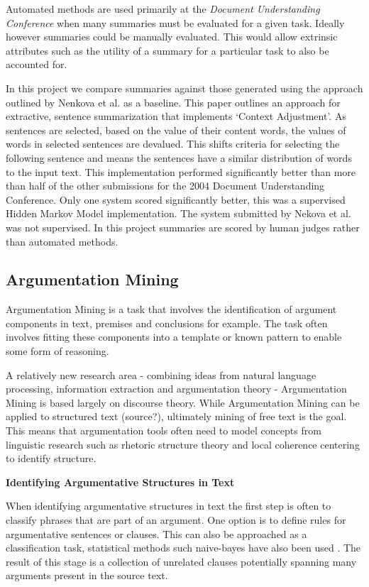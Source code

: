         Automated methods are used primarily at the \textit{Document Understanding Conference} when many summaries must be evaluated for a given task. Ideally however summaries could be manually evaluated. This would allow extrinsic attributes such as the utility of a summary for a particular task to also be accounted for.

        In this project we compare summaries against those generated using the approach outlined by Nenkova et al. \cite{nenkova2006compositional} as a baseline. This paper outlines an approach for extractive, sentence summarization that implements `Context Adjustment'. As sentences are selected, based on the value of their content words, the values of words in selected sentences are devalued. This shifts criteria for selecting the following sentence and means the sentences have a similar distribution of words to the input text. This implementation performed significantly better than more than half of the other submissions for the 2004 Document Understanding Conference. Only one system scored significantly better, this was a supervised Hidden Markov Model implementation. The system submitted by Nekova et al. was not supervised. In this project summaries are scored by human judges rather than automated methods.

    \tocless\subsection{Argumentation Mining}
      Argumentation Mining is a task that involves the identification of argument components in text, premises and conclusions for example. The task often involves fitting these components into a template or known pattern to enable some form of reasoning. \cite{palau2009argumentation}

      A relatively new research area - combining ideas from natural language processing, information extraction and argumentation theory - Argumentation Mining is based largely on discourse theory. While Argumentation Mining can be applied to structured text (source?), ultimately mining of free text is the goal. This means that argumentation tools often need to model concepts from linguistic research such as rhetoric structure theory \cite{mann1988rhetorical} and local coherence centering \cite{weinstein21centering} to identify structure.

      \noindent\textbf{Identifying Argumentative Structures in Text}

        \noindent When identifying argumentative structures in text the first step is often to classify phrases that are part of an argument. One option is to define rules for argumentative sentences or clauses. This can also be approached as a classification task, statistical methods such naive-bayes have also been used \cite{palau2009argumentation}. The result of this stage is a collection of unrelated clauses potentially spanning many arguments present in the source text.

